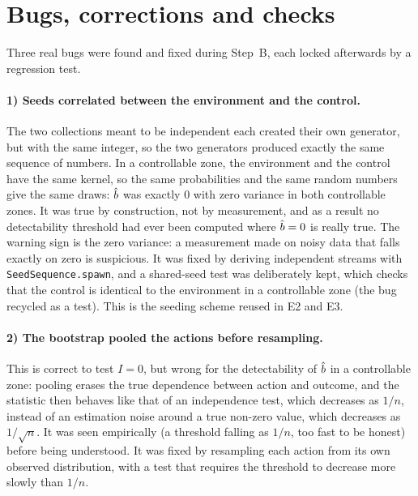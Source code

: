 \documentclass[10pt]{article}
\begin{document}
\section{Bugs, corrections and checks}
\label{sec:bugs}

Three real bugs were found and fixed during Step~B, each locked afterwards by a regression test.

\paragraph{1) Seeds correlated between the environment and the control.} %
The two collections meant to be independent each created their own generator, but with the same integer, so the two
generators produced exactly the same sequence of numbers.
In a controllable zone, the environment and the control have the same kernel, so the same probabilities and the same
random numbers give the same draws: $\hat{b}$ was exactly 0 with zero variance in both controllable zones. %
It was true by construction, not by measurement, and as a result no detectability threshold had ever been computed where
$\hat{b} = 0$ is really true. %
The warning sign is the zero variance: a measurement made on noisy data that falls exactly on zero is suspicious.
It was fixed by deriving independent streams with \texttt{SeedSequence.spawn}, and a shared-seed test was deliberately
kept, which checks that the control is identical to the environment in a controllable zone (the bug recycled as a test).
This is the seeding scheme reused in E2 and E3.

\paragraph{2) The bootstrap pooled the actions before resampling.} %
This is correct to test $I = 0$, but wrong for the detectability of $\hat{b}$ in a controllable zone: pooling erases the true %
dependence between action and outcome, and the statistic then behaves like that of an independence test, which decreases
as $1/n$, instead of an estimation noise around a true non-zero value, which decreases as $1/\sqrt{n}$. %
It was seen empirically (a threshold falling as $1/n$, too fast to be honest) before being understood. %
It was fixed by resampling each action from its own observed distribution, with a test that requires the threshold to
decrease more slowly than $1/n$. %
\end{document}
